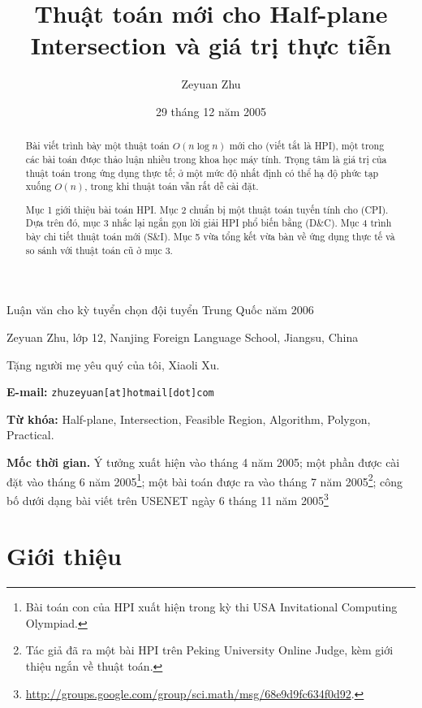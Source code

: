 \documentclass[11pt]{article}
\title{Thuật toán mới cho Half-plane Intersection và giá trị thực tiễn}
\author{Zeyuan Zhu}
\date{29 tháng 12 năm 2005}
\begin{document}
\maketitle


\begin{center}
  \small Luận văn cho kỳ tuyển chọn đội tuyển Trung Quốc năm 2006

  \smallskip
  Zeyuan Zhu, lớp 12, Nanjing Foreign Language School, Jiangsu, China

  \smallskip
  Tặng người mẹ yêu quý của tôi, Xiaoli Xu.
\end{center}

\noindent\textbf{E-mail:} \texttt{zhuzeyuan[at]hotmail[dot]com}

\noindent\textbf{Từ khóa:} Half-plane, Intersection, Feasible Region, Algorithm,
Polygon, Practical.

\begin{abstract}
Bài viết trình bày một thuật toán \(O(n\log n)\) mới cho
 (viết tắt là HPI), một trong các bài toán được
thảo luận nhiều trong khoa học máy tính. Trọng tâm là giá trị của thuật toán
trong ứng dụng thực tế; ở một mức độ nhất định có thể hạ độ phức tạp xuống
\(O(n)\), trong khi thuật toán vẫn rất dễ cài đặt.

Mục 1 giới thiệu bài toán HPI. Mục 2 chuẩn bị một thuật toán tuyến tính cho
 (CPI). Dựa trên đó, mục 3 nhắc lại ngắn gọn
lời giải HPI phổ biến bằng  (D\&C). Mục 4 trình bày
chi tiết thuật toán mới  (S\&I). Mục 5 vừa tổng kết
vừa bàn về ứng dụng thực tế và so sánh với thuật toán cũ ở mục 3.
\end{abstract}

\noindent\textbf{Mốc thời gian.} Ý tưởng xuất hiện vào tháng 4 năm 2005; một
phần được cài đặt vào tháng 6 năm 2005\footnote{Bài toán con của HPI xuất hiện
trong kỳ thi USA Invitational Computing Olympiad.}; một bài toán được ra vào
tháng 7 năm 2005\footnote{Tác giả đã ra một bài HPI trên Peking University
Online Judge, kèm giới thiệu ngắn về thuật toán.}; công bố dưới dạng bài viết
trên USENET ngày 6 tháng 11 năm 2005\footnote{\url{http://groups.google.com/group/sci.math/msg/68e9d9fc634f0d92}.}

\section{Giới thiệu}
\end{document}
